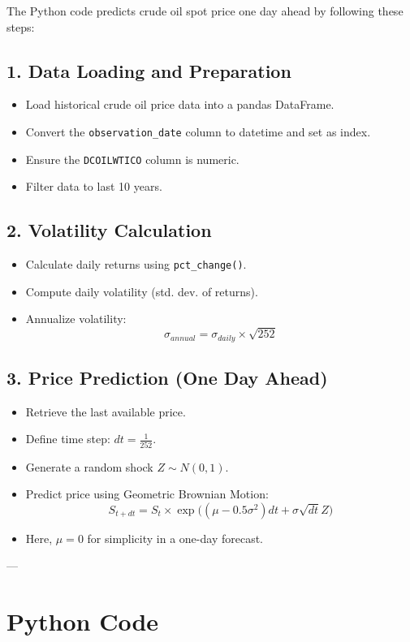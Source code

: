 \documentclass[12pt]{article}
\begin{document}
The Python code predicts crude oil spot price one day ahead by following these steps:

\subsection{1. Data Loading and Preparation}
\begin{itemize}
  \item Load historical crude oil price data into a pandas DataFrame.
  \item Convert the \texttt{observation\_date} column to datetime and set as index.
  \item Ensure the \texttt{DCOILWTICO} column is numeric.
  \item Filter data to last 10 years.
\end{itemize}

\subsection{2. Volatility Calculation}
\begin{itemize}
  \item Calculate daily returns using \texttt{pct\_change()}.
  \item Compute daily volatility (std. dev. of returns).
  \item Annualize volatility:  
  \[
  \sigma_{annual} = \sigma_{daily} \times \sqrt{252}
  \]
\end{itemize}

\subsection{3. Price Prediction (One Day Ahead)}
\begin{itemize}
  \item Retrieve the last available price.
  \item Define time step: \( dt = \tfrac{1}{252} \).
  \item Generate a random shock \( Z \sim N(0,1) \).
  \item Predict price using Geometric Brownian Motion:
  \[
  S_{t+dt} = S_t \times \exp\Big( (\mu - 0.5\sigma^2)dt + \sigma\sqrt{dt}Z \Big)
  \]
  \item Here, \(\mu = 0\) for simplicity in a one-day forecast.
\end{itemize}

---

\section{Python Code}
\end{document}
